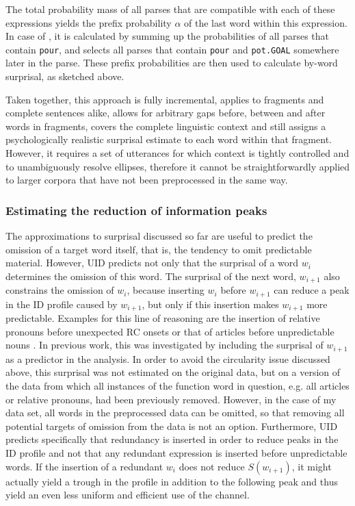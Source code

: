 The total probability mass of all parses that are compatible with each of these expressions yields the prefix probability $\alpha$ of the last word within this expression. In case of \Last[a], it is calculated by summing up the probabilities of all parses that contain \texttt{pour}, and \Last[b] selects all parses that contain \texttt{pour} and \texttt{pot.GOAL} somewhere later in the parse. These prefix probabilities are then used to calculate by-word surprisal, as sketched above.

Taken together, this approach is fully incremental, applies to fragments and complete sentences alike, allows for arbitrary gaps before, between and after words in fragments, covers the complete linguistic context and still assigns a psychologically realistic surprisal estimate to each word within that fragment. However, it requires a set of utterances for which context is tightly controlled and to unambiguously resolve ellipses, therefore it cannot be straightforwardly applied to larger corpora that have not been preprocessed in the same way.

\subsubsection{Estimating the reduction of information peaks}
The approximations to surprisal discussed so far are useful to predict the omission of a target word itself, that is, the tendency to omit predictable material. However, UID predicts not only that the surprisal of a word $w_i$ determines the omission of this word. The surprisal of the next word, $w_{i+1}$ also constrains the omission of $w_i$, because inserting $w_i$ before $w_{i+1}$ can reduce a peak in the ID profile caused by $w_{i+1}$, but only if this insertion makes $w_{i+1}$ more predictable. Examples for this line of reasoning are the insertion of relative pronouns before unexpected RC onsets \citep{levy.jaeger2007} or that of articles before unpredictable nouns \citep{lemke.etal2017}. In previous work, this was investigated by including the surprisal of $w_{i+1}$ as a predictor in the analysis. In order to avoid the circularity issue discussed above, this surprisal was not estimated on the original data, but on a version of the data from which all instances of the function word in question, e.g. all articles or relative pronouns, had been previously removed. However, in the case of my data set, all words in the preprocessed data can be omitted, so that removing all potential targets of omission from the data is not an option. Furthermore, UID predicts specifically that redundancy is inserted in order to reduce peaks in the ID profile and not that any redundant expression is inserted before unpredictable words. If the insertion of a redundant $w_i$ does not reduce $S(w_{i+1})$, it might actually yield a trough in the profile in addition to the following peak and thus yield an even less uniform and efficient use of the channel.

